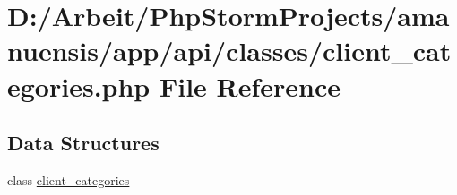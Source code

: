 \hypertarget{a00055}{}\section{D\+:/\+Arbeit/\+Php\+Storm\+Projects/amanuensis/app/api/classes/client\+\_\+categories.php File Reference}
\label{a00055}
\subsection*{Data Structures}
\begin{DoxyCompactItemize}
\item 
class \hyperlink{a00016}{client\+\_\+categories}
\end{DoxyCompactItemize}
